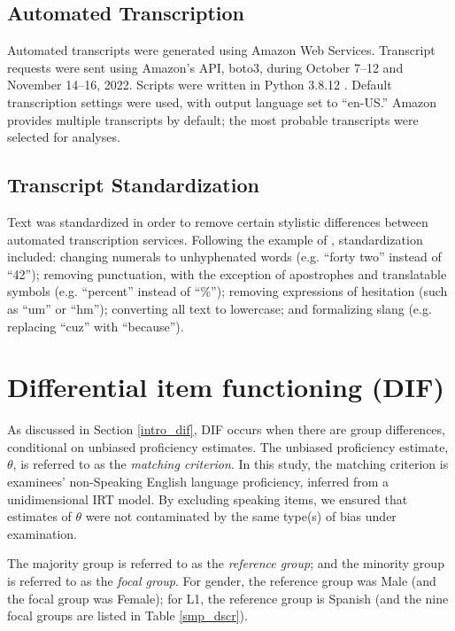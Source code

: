 \documentclass [PhD] {uclathes}
\begin{document}
\subsection{Automated Transcription}
\label{meth_auto_transcribe}

Automated transcripts were generated using Amazon Web Services. Transcript requests were sent using Amazon’s API, boto3, during October 7–12 and November 14–16, 2022. Scripts were written in Python 3.8.12 \citep{python2022}. Default transcription settings were used, with output language set to “en-US.” Amazon provides multiple transcripts by default; the most probable transcripts were selected for analyses.

\subsection{Transcript Standardization}
\label{sec:meth_text_standardization}

Text was standardized in order to remove certain stylistic differences between automated transcription services. Following the example of \cite{koenecke2020}, standardization included: changing numerals to unhyphenated words (e.g. “forty two” instead of “42”); removing punctuation, with the exception of apostrophes and translatable symbols (e.g. “percent” instead of “\%”); removing expressions of hesitation (such as “um” or “hm”); converting all text to lowercase; and formalizing slang (e.g. replacing “cuz” with “because”).

\section{Differential item functioning (DIF)}
\label{meth_dif}

As discussed in Section \ref{intro_dif}, DIF occurs when there are group differences, conditional on unbiased proficiency estimates. The unbiased proficiency estimate, $\theta$, is referred to as the \emph{matching criterion}. In this study, the matching criterion is examinees’ non-Speaking English language proficiency, inferred from a unidimensional IRT model. By excluding speaking items, we ensured that estimates of $\theta$ were not contaminated by the same type(s) of bias under examination.

The majority group is referred to as the \emph{reference group}; and the minority group is referred to as the \emph{focal group}. For gender, the reference group was Male (and the focal group was Female); for L1, the reference group is Spanish (and the nine focal groups are listed in Table \ref{smp_dscr}).
\end{document}
